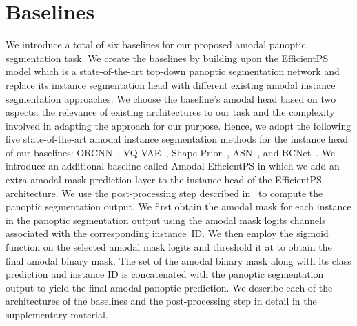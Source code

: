 \documentclass[10pt,twocolumn,letterpaper]{article}
\begin{document}
\section{Baselines}
We introduce a total of six baselines for our proposed amodal panoptic segmentation task. We create the baselines by building upon the EfficientPS~\cite{mohan2020efficientps} model which is a state-of-the-art top-down panoptic segmentation network and replace its instance segmentation head with different existing amodal instance segmentation approaches. We choose the baseline's amodal head based on two aspects: the relevance of existing architectures to our task and the complexity involved in adapting the approach for our purpose. Hence, we adopt the following five state-of-the-art amodal instance segmentation methods for the instance head of our baselines: ORCNN~\cite{follmann2019learning}, VQ-VAE~\cite{jang2020learning}, Shape Prior~\cite{yuting2021amodal}, ASN~\cite{qi2019amodal}, and BCNet~\cite{Ke_2021_CVPR}. We introduce an additional baseline called Amodal-EfficientPS in which we add an extra amodal mask prediction layer to the instance head of the EfficientPS architecture. We use the post-processing step described in~\cite{mohan2020efficientps} to compute the panoptic segmentation output. We first obtain the amodal mask for each instance in the panoptic segmentation output using the amodal mask logits channels associated with the corresponding instance~ID. We then employ the sigmoid function on the selected amodal mask logits and threshold it at  to obtain the final amodal binary mask. The set of the amodal binary mask along with its class prediction and instance ID is concatenated with the panoptic segmentation output to yield the final amodal panoptic prediction. We describe each of the architectures of the baselines and the post-processing step in detail in the supplementary material. 
\end{document}
